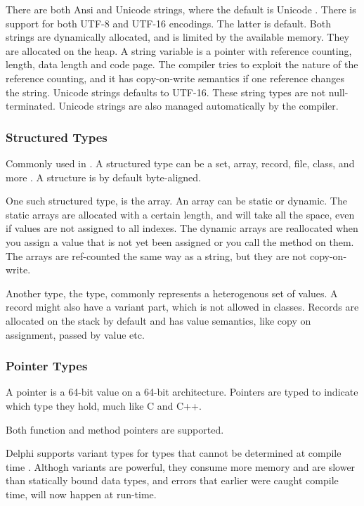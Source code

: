 There are both Ansi and Unicode strings, where the default is Unicode \cite{noauthor_undated-cp}. There is support for both UTF-8 and UTF-16 encodings. The latter is default. Both strings are dynamically allocated, and is limited by the available memory. They are allocated on the heap. A string variable is a pointer with reference counting, length, data length and code page. The compiler tries to exploit the nature of the reference counting, and it has copy-on-write semantics if one reference changes the string. Unicode strings defaults to UTF-16. These string types are not null-terminated. Unicode strings are also managed automatically by the compiler.

\subsubsection{Structured Types}
\label{ssub:Structured Types}
Commonly used in \delphi. A structured type can be a set, array, record, file, class, and more \cite{noauthor_undated-vu}. A structure is by default byte-aligned.

One such structured type, is the array. An array can be static or dynamic. The static arrays are allocated with a certain length, and will take all the space, even if values are not assigned to all indexes. The dynamic arrays are reallocated when you assign a value that is not yet been assigned or you call the  method on them. The arrays are ref-counted the same way as a string, but they are not copy-on-write.

Another type, the  type, commonly represents a heterogenous set of values. A record might also have a variant part, which is not allowed in classes. Records are allocated on the stack by default and has value semantics, like copy on assignment, passed by value etc.

\subsubsection{Pointer Types}
\label{ssub:Pointer Types}
A pointer is a 64-bit value on a 64-bit architecture. Pointers are typed to indicate which type they hold, much like C and C++.

Both function and method pointers are supported.

Delphi supports variant types for types that cannot be determined at compile time \cite{noauthor_undated-mx}. Althogh variants are powerful, they consume more memory and are slower than statically bound data types, and errors that earlier were caught compile time, will now happen at run-time.

